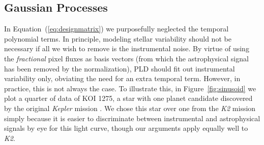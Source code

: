 \documentclass[]{emulateapj}
\begin{document}
\subsection{Gaussian Processes}
\label{sec:gp}
\begin{figure*}[t]
  \begin{center}
    \leavevmode
       \caption{Different de-trending techniques for quarter 4 of KIC 8583696 (KOI 1275),
                a planet candidate host from the original \emph{Kepler} mission. The original
                data are shown in the left column; in the other columns we
                artificially injected a sinusoidal signal with a period
                of 25 days and an amplitude comparable to that of the instrumental variability.
                The top row shows the raw SAP data (black) and the first order
                PLD model (red); the residuals of the fit are indicated directly below. 
                The third row shows the final residuals after smoothing 
                with a GP to eliminate low-frequency stellar variability. Finally, the bottom
                row shows these residuals folded on the orbital period of the planet
                candidate (black), with the 1-hr median indicated in red. Combining PLD with a GP
                ensures PLD fits out only the instrumental variability without inflating the white noise.
                }
     \label{fig:sinusoid}
  \end{center}
\end{figure*}

In Equation~(\ref{eq:designmatrix}) we purposefully neglected the temporal polynomial
terms. In principle, modeling stellar variability should not be necessary if all we wish 
to remove is the instrumental noise. By virtue of using the
\emph{fractional} pixel fluxes as basis vectors (from which the astrophysical signal
has been removed by the normalization), PLD should fit out instrumental variability only,
obviating the need for an extra temporal term. However, in practice, this is not always
the case. To illustrate this, in Figure~\ref{fig:sinusoid} we plot a quarter of data
of KOI 1275, a star with one planet candidate discovered by the original \emph{Kepler}
mission \citep{BOR11}. We chose this star over one from the \emph{K2}
mission simply because it is easier to discriminate between instrumental and
astrophysical signals by eye for this light curve, though our arguments apply
equally well to \emph{K2}.
\end{document}
